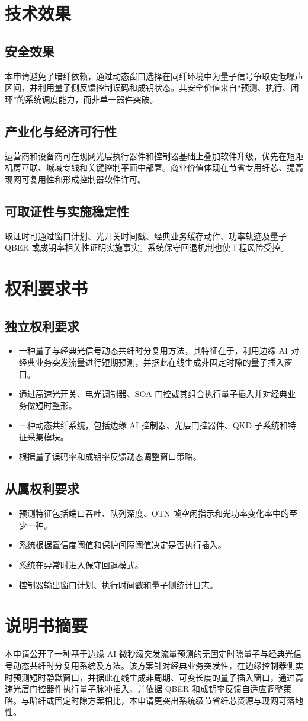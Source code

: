 ﻿\documentclass[12pt,a4paper]{article}
\begin{document}
\section{技术效果}
\subsection{安全效果}
本申请避免了暗纤依赖，通过动态窗口选择在同纤环境中为量子信号争取更低噪声区间，并利用量子侧反馈控制误码和成钥状态。其安全价值来自“预测、执行、闭环”的系统调度能力，而非单一器件突破。

\subsection{产业化与经济可行性}
运营商和设备商可在现网光层执行器件和控制器基础上叠加软件升级，优先在短距机房互联、城域专线和关键控制平面中部署。商业价值体现在节省专用纤芯、提高现网可复用性和形成控制器软件许可。

\subsection{可取证性与实施稳定性}
取证时可通过窗口计划、光开关时间戳、经典业务缓存动作、功率轨迹及量子 QBER 或成钥率相关性证明实施事实。系统保守回退机制也使工程风险受控。

\section{权利要求书}
\subsection{独立权利要求}
\begin{itemize}
\item 一种量子与经典光信号动态共纤时分复用方法，其特征在于，利用边缘 AI 对经典业务突发流量进行短期预测，并据此在线生成非固定时隙的量子插入窗口。
\item 通过高速光开关、电光调制器、SOA 门控或其组合执行量子插入并对经典业务做短时整形。
\item 一种动态共纤系统，包括边缘 AI 控制器、光层门控器件、QKD 子系统和特征采集模块。
\item 根据量子误码率和成钥率反馈动态调整窗口策略。
\end{itemize}

\subsection{从属权利要求}
\begin{itemize}
\item 预测特征包括端口吞吐、队列深度、OTN 帧空闲指示和光功率变化率中的至少一种。
\item 系统根据置信度阈值和保护间隔阈值决定是否执行插入。
\item 系统在异常时进入保守回退模式。
\item 控制器输出窗口计划、执行时间戳和量子侧统计日志。
\end{itemize}

\section{说明书摘要}
本申请公开了一种基于边缘 AI 微秒级突发流量预测的无固定时隙量子与经典光信号动态共纤时分复用系统及方法。该方案针对经典业务突发性，在边缘控制器侧实时预测短时静默窗口，并据此在线生成非周期、可变长度的量子插入窗口，通过高速光层门控器件执行量子脉冲插入，并依据 QBER 和成钥率反馈自适应调整策略。与暗纤或固定时隙方案相比，本申请更突出系统级节省纤芯资源与现网可落地性。
\end{document}
